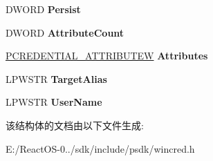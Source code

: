 \begin{DoxyCompactItemize}
D\+W\+O\+RD {\bfseries Persist}
\item 
\mbox{\label{struct___c_r_e_d_e_n_t_i_a_l_w_a3ea421304f00db0fa20ea94e8887a8a0}} 
D\+W\+O\+RD {\bfseries Attribute\+Count}
\item 
\mbox{\label{struct___c_r_e_d_e_n_t_i_a_l_w_a87da9e47ca5ccef3e7758e047f9cbecd}} 
\hyperlink{struct___c_r_e_d_e_n_t_i_a_l___a_t_t_r_i_b_u_t_e_w}{P\+C\+R\+E\+D\+E\+N\+T\+I\+A\+L\+\_\+\+A\+T\+T\+R\+I\+B\+U\+T\+EW} {\bfseries Attributes}
\item 
\mbox{\label{struct___c_r_e_d_e_n_t_i_a_l_w_ae797f836da571925e650e0a818b323d8}} 
L\+P\+W\+S\+TR {\bfseries Target\+Alias}
\item 
\mbox{\label{struct___c_r_e_d_e_n_t_i_a_l_w_abac9a55dbb387c4aec9d1853f259cb12}} 
L\+P\+W\+S\+TR {\bfseries User\+Name}
\end{DoxyCompactItemize}


该结构体的文档由以下文件生成\+:\begin{DoxyCompactItemize}
\item 
E\+:/\+React\+O\+S-\/0../sdk/include/psdk/wincred.\+h\end{DoxyCompactItemize}
